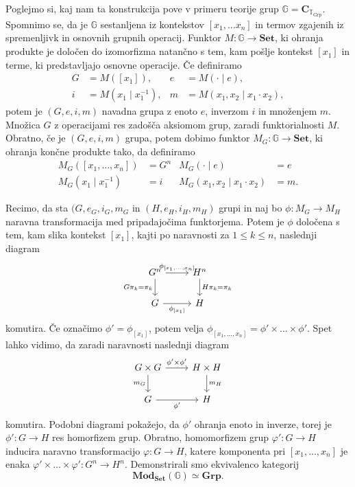 \documentclass[../kategoricna_logika.tex]{subfiles}
\begin{document}
\begin{primer}
  Poglejmo si, kaj nam ta konstrukcija pove v primeru teorije grup
  $\mathbb{G} = \mathbf{C}_{\mathbb{T}_{\mathrm{Grp}}}$. Spomnimo se,
  da je $\mathbb{G}$ sestanljena iz kontekstov $[x_1, \ldots x_n]$ in
  termov zgajenih iz spremenljivk in osnovnih grupnih operacij.
  Funktor $M : \mathbb{G} \to \mathbf{Set}$, ki ohranja produkte
  je določen do izomorfizma natančno s tem, kam pošlje kontekst $[x_1]$
  in terme, ki predstavljajo osnovne operacije. Če definiramo
\begin{align*}
  G &= M([x_1]), & e &= M(\cdot \mid e), \\
  i &= M(x_1 \mid x_1^{-1}), & m &= M(x_1,x_2 \mid x_1 \cdot x_2),
\end{align*}
potem je $(G,e,i,m)$ navadna grupa z enoto $e$, inverzom $i$ in
množenjem $m$. Množica $G$ z operacijami res zadošča aksiomom
grup, zaradi funktorialnosti $M$. Obratno, če je $(G,e,i,m)$ grupa,
potem dobimo funktor $M_{G} : \mathbb{G} \to \mathbf{Set}$,
ki ohranja končne produkte tako, da definiramo
\begin{align*}
  M_{G}([x_1, \ldots, x_n]) &= G^n & M_{G}(\cdot \mid e) &= e \\
  M_{G}(x_1 \mid x_1^{-1}) &= i & M_{G}(x_1, x_2 \mid x_1 \cdot x_2) &= m.
\end{align*}

Recimo, da sta $(G,e_{G}, i_{G}, m_{G}$ in $(H, e_H, i_H, m_H)$ grupi
in naj bo $\phi : M_{G} \to M_H$ naravna transformacija med pripadajočima
funktorjema. Potem je $\phi$ določena s tem, kam slika kontekst $[x_1]$,
kajti po naravnosti za $1 \leq k \leq n$, naslednji diagram
\begin{equation*}
\begin{tikzcd}\label{primer:grupe-kot-funktorji}
  G^n \ar[d, "G\pi_k = \pi_k"'] \ar[r, "\phi_{[x_1, \ldots, x_n]}"] & H^n \ar[d, "H\pi_k = \pi_k"] \\
  G \ar[r, "\phi_{[x_1]}"'] & H
\end{tikzcd}
\end{equation*}
komutira. Če označimo $\phi' = \phi_{[x_1]}$, potem velja
$\phi_{[x_1, \ldots, x_n]} = \phi' \times \ldots \times \phi'$.
Spet lahko vidimo, da zaradi naravnosti naslednji diagram
\begin{equation*}
\begin{tikzcd}\label{sec:modeli-kot-funtorji-3}
  G \times G \ar[d, "m_{G}"'] \ar[r, "\phi' \times \phi'"] & H \times H \ar[d, "m_H"] \\
  G \ar[r, "\phi'"'] & H
\end{tikzcd}
\end{equation*}
komutira. Podobni diagrami pokažejo, da $\phi'$ ohranja enoto in
inverze, torej je $\phi' : G \to H$ res homorfizem grup.
Obratno, homomorfizem grup $\varphi' : G \to H$ inducira naravno
transformacijo $\varphi : G \to H$, katere komponenta pri
$[x_1, \ldots, x_n]$ je enaka $\varphi' \times \ldots \times \varphi' : G^n \to H^n$.
Demonstrirali smo ekvivalenco kategorij
\[ \mathbf{Mod}_{\mathbf{Set}}(\mathbb{G}) \simeq \mathbf{Grp}. \]
\end{primer}
\end{document}
